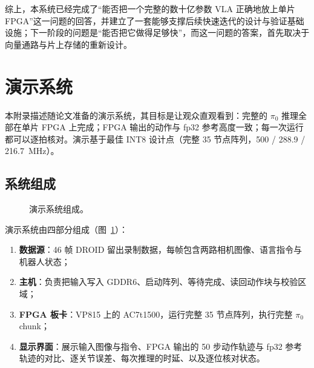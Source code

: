 \documentclass[a4paper,10.5pt]{ctexart}
\newcommand{\pizero}{$\pi_0$}
\begin{document}
综上，本系统已经完成了“能否把一个完整的数十亿参数 VLA 正确地放上单片 FPGA”这一问题的回答，并建立了一套能够支撑后续快速迭代的设计与验证基础设施；下一阶段的问题是“能否把它做得足够快”，而这一问题的答案，首先取决于向量通路与片上存储的重新设计。

\appendix

\section{演示系统}\label{sec:demo}

本附录描述随论文准备的演示系统，其目标是让观众直观看到：完整的 \pizero{} 推理全部在单片 FPGA 上完成；FPGA 输出的动作与 fp32 参考高度一致；每一次运行都可以逐拍核对。演示基于最佳 INT8 设计点（完整 35 节点阵列，500 / 288.9 / 216.7~MHz）。

\subsection{系统组成}

\begin{figure}[t]
\centering
{}
\caption{演示系统组成。}
\label{fig:demo}
\end{figure}

演示系统由四部分组成（图~\ref{fig:demo}）：
\begin{enumerate}
  \item \textbf{数据源}：46 帧 DROID 留出录制数据，每帧包含两路相机图像、语言指令与机器人状态；
  \item \textbf{主机}：负责把输入写入 GDDR6、启动阵列、等待完成、读回动作块与校验区域；
  \item \textbf{FPGA 板卡}：VP815 上的 AC7t1500，运行完整 35 节点阵列，执行完整 \pizero{} chunk；
  \item \textbf{显示界面}：展示输入图像与指令、FPGA 输出的 50 步动作轨迹与 fp32 参考轨迹的对比、逐关节误差、每次推理的时延、以及逐位核对状态。
\end{enumerate}
\end{document}
